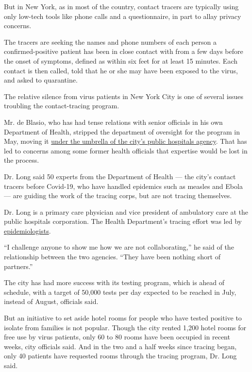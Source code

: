 But in New York, as in most of the country, contact tracers are
typically using only low-tech tools like phone calls and a
questionnaire, in part to allay privacy concerns.

The tracers are seeking the names and phone numbers of each person a
confirmed-positive patient has been in close contact with from a few
days before the onset of symptoms, defined as within six feet for at
least 15 minutes. Each contact is then called, told that he or she may
have been exposed to the virus, and asked to quarantine.

The relative silence from virus patients in New York City is one of
several issues troubling the contact-tracing program.

Mr. de Blasio, who has had tense relations with senior officials in his
own Department of Health, stripped the department of oversight for the
program in May, moving it
\href{https://www.nytimes3xbfgragh.onion/2020/05/07/nyregion/coronavirus-contact-tracing-nyc.html}{under
the umbrella of the city's public hospitals agency}. That has led to
concerns among some former health officials that expertise would be lost
in the process.

Dr. Long said 50 experts from the Department of Health --- the city's
contact tracers before Covid-19, who have handled epidemics such as
measles and Ebola --- are guiding the work of the tracing corps, but are
not tracing themselves.

Dr. Long is a primary care physician and vice president of ambulatory
care at the public hospitals corporation. The Health Department's
tracing effort was led by
\href{https://www.publichealth.columbia.edu/people/our-faculty/sa3217}{epidemiologists}.

``I challenge anyone to show me how we are not collaborating,'' he said
of the relationship between the two agencies. ``They have been nothing
short of partners.''

The city has had more success with its testing program, which is ahead
of schedule, with a target of 50,000 tests per day expected to be
reached in July, instead of August, officials said.

But an initiative to set aside hotel rooms for people who have tested
positive to isolate from families is not popular. Though the city rented
1,200 hotel rooms for free use by virus patients, only 60 to 80 rooms
have been occupied in recent weeks, city officials said. And in the two
and a half weeks since tracing began, only 40 patients have requested
rooms through the tracing program, Dr. Long said.

